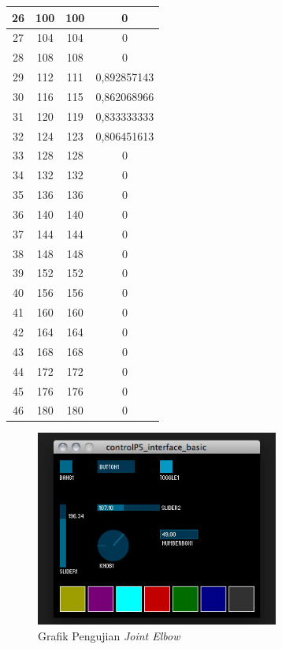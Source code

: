 \begin{table}[]
\begin{tabular}{|c|c|c|c|}
 		26 & 100     & 100      & 0           \\ \hline
 		27 & 104     & 104      & 0           \\ \hline
 		28 & 108     & 108      & 0           \\ \hline
 		29 & 112     & 111      & 0,892857143 \\ \hline
 		30 & 116     & 115      & 0,862068966 \\ \hline
 		31 & 120     & 119      & 0,833333333 \\ \hline
 		32 & 124     & 123      & 0,806451613 \\ \hline
 		33 & 128     & 128      & 0           \\ \hline
 		34 & 132     & 132      & 0           \\ \hline
 		35 & 136     & 136      & 0           \\ \hline
 		36 & 140     & 140      & 0           \\ \hline
 		37 & 144     & 144      & 0           \\ \hline
 		38 & 148     & 148      & 0           \\ \hline
 		39 & 152     & 152      & 0           \\ \hline
 		40 & 156     & 156      & 0           \\ \hline
 		41 & 160     & 160      & 0           \\ \hline
 		42 & 164     & 164      & 0           \\ \hline
 		43 & 168     & 168      & 0           \\ \hline
 		44 & 172     & 172      & 0           \\ \hline
 		45 & 176     & 176      & 0           \\ \hline
 		46 & 180     & 180      & 0           \\ \hline
 	\end{tabular}
 \end{table} 
 \begin{figure}[H]
 	\centering
 	\includegraphics[width=8cm]{gambar/controlp5.jpg}
 	\caption{Grafik Pengujian \textit{Joint Elbow}}
 	\label{pic.jointelbow}
 \end{figure}
 
